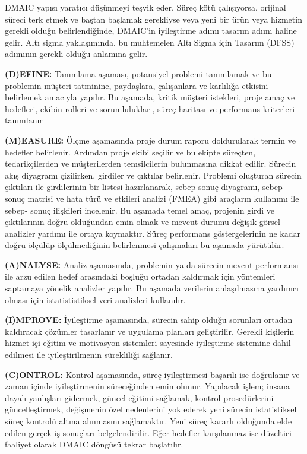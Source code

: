 \documentclass[
]{book}
\begin{document}
DMAIC yapısı yaratıcı düşünmeyi teşvik eder. Süreç kötü çalışıyorsa, orijinal süreci terk etmek ve baştan başlamak gerekliyse veya yeni bir ürün veya hizmetin gerekli olduğu belirlendiğinde, DMAIC'in iyileştirme adımı tasarım adımı haline gelir. Altı sigma yaklaşımında, bu muhtemelen Altı Sigma için Tasarım (DFSS) adımının gerekli olduğu anlamına gelir.

\textbf{(D)EFINE:} Tanımlama aşaması, potansiyel problemi tanımlamak ve bu problemin müşteri tatminine, paydaşlara, çalışanlara ve karlılığa etkisini belirlemek amacıyla yapılır. Bu aşamada, kritik müşteri istekleri, proje amaç ve hedefleri, ekibin rolleri ve sorumlulukları, süreç haritası ve performans kriterleri tanımlanır

\textbf{(M)EASURE:} Ölçme aşamasında proje durum raporu doldurularak termin ve hedefler belirlenir. Ardından proje ekibi seçilir ve bu ekipte süreçten, tedarikçilerden ve müşterilerden temsilcilerin bulunmasına dikkat edilir. Sürecin akış diyagramı çizilirken, girdiler ve çıktılar belirlenir. Problemi oluşturan sürecin çıktıları ile girdilerinin bir listesi hazırlanarak, sebep-sonuç diyagramı, sebep-sonuç matrisi ve hata türü ve etkileri analizi (FMEA) gibi araçların kullanımı ile sebep- sonuç ilişkileri incelenir. Bu aşamada temel amaç, projenin girdi ve çıktılarının doğru olduğundan emin olmak ve mevcut durumu değişik görsel analizler yardımı ile ortaya koymaktır. Süreç performans göstergelerinin ne kadar doğru ölçülüp ölçülmediğinin belirlenmesi çalışmaları bu aşamada yürütülür.

\textbf{(A)NALYSE:} Analiz aşamasında, problemin ya da sürecin mevcut performansı ile arzu edilen hedef arasındaki boşluğu ortadan kaldırmak için yöntemleri saptamaya yönelik analizler yapılır. Bu aşamada verilerin anlaşılmasına yardımcı olması için istatististiksel veri analizleri kullanılır.

\textbf{(I)MPROVE:} İyileştirme aşamasında, sürecin sahip olduğu sorunları ortadan kaldıracak çözümler tasarlanır ve uygulama planları geliştirilir. Gerekli kişilerin hizmet içi eğitim ve motivasyon sistemleri sayesinde iyileştirme sistemine dahil edilmesi ile iyileştirilmenin sürekliliği sağlanır.

\textbf{(C)ONTROL:} Kontrol aşamasında, süreç iyileştirmesi başarılı ise doğrulanır ve zaman içinde iyileştirmenin süreceğinden emin olunur. Yapılacak işlem; insana dayalı yanlışları gidermek, güncel eğitimi sağlamak, kontrol prosedürlerini güncelleştirmek, değişmenin özel nedenlerini yok ederek yeni sürecin istatistiksel süreç kontrolü altına alınmasını sağlamaktır. Yeni süreç kararlı olduğunda elde edilen gerçek iş sonuçları belgelendirilir. Eğer hedefler karşılanmaz ise düzeltici faaliyet olarak DMAIC döngüsü tekrar başlatılır.
\end{document}
